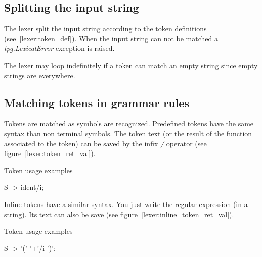 \subsection{Splitting the input string}

The lexer split the input string according to the token definitions (see~\ref{lexer:token_def}). When the input string can not be matched a \emph{tpg.LexicalError} exception is raised.

The lexer may loop indefinitely if a token can match an empty string since empty strings are everywhere.

\subsection{Matching tokens in grammar rules}

Tokens are matched as symbols are recognized.
Predefined tokens have the same syntax than non terminal symbols.
The token text (or the result of the function associated to the token) can be saved by the infix \emph{/} operator (see figure~\ref{lexer:token_ret_val}).

\begin{code}
\caption{Token usage examples}								\label{lexer:token_ret_val}
\begin{verbatimtab}[4]
	S -> ident/i;
\end{verbatimtab}
\end{code}

Inline tokens have a similar syntax. You just write the regular expression (in a string). Its text can also be save (see figure~\ref{lexer:inline_token_ret_val}).

\begin{code}
\caption{Token usage examples}								\label{lexer:inline_token_ret_val}
\begin{verbatimtab}[4]
	S -> '(' '\w+'/i ')';
\end{verbatimtab}
\end{code}

